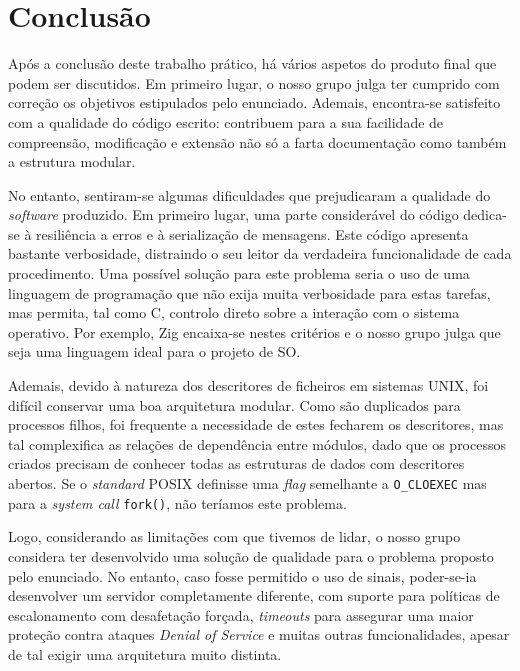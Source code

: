 \documentclass[11pt]{article}
\begin{document}
\section{Conclusão}

Após a conclusão deste trabalho prático, há vários aspetos do produto final que podem ser
discutidos. Em primeiro lugar, o nosso grupo julga ter cumprido com correção os objetivos
estipulados pelo enunciado. Ademais, encontra-se satisfeito com a qualidade do código escrito:
contribuem para a sua facilidade de compreensão, modificação e extensão não só a farta documentação
como também a estrutura modular.

No entanto, sentiram-se algumas dificuldades que prejudicaram a qualidade do \emph{software}
produzido. Em primeiro lugar, uma parte considerável do código dedica-se à resiliência a erros e à
serialização de mensagens. Este código apresenta bastante verbosidade, distraindo o seu leitor da
verdadeira funcionalidade de cada procedimento. Uma possível solução para este problema seria o uso
de uma linguagem de programação que não exija muita verbosidade para estas tarefas, mas permita, tal
como C, controlo direto sobre a interação com o sistema operativo. Por exemplo, Zig encaixa-se
nestes critérios e o nosso grupo julga que seja uma linguagem ideal para o projeto de SO.

Ademais, devido à natureza dos descritores de ficheiros em sistemas UNIX, foi difícil conservar uma
boa arquitetura modular. Como são duplicados para processos filhos, foi frequente a necessidade de
estes fecharem os descritores, mas tal complexifica as relações de dependência entre módulos, dado
que os processos criados precisam de conhecer todas as estruturas de dados com descritores abertos.
Se o \emph{standard} POSIX definisse uma \emph{flag} semelhante a \texttt{O\_CLOEXEC} mas para a
\emph{system call} \texttt{fork()}, não teríamos este problema.

Logo, considerando as limitações com que tivemos de lidar, o nosso grupo considera ter desenvolvido
uma solução de qualidade para o problema proposto pelo enunciado. No entanto, caso fosse permitido o
uso de sinais, poder-se-ia desenvolver um servidor completamente diferente, com suporte para
políticas de escalonamento com desafetação forçada, \emph{timeouts} para assegurar uma maior
proteção contra ataques \emph{Denial of Service} e muitas outras funcionalidades, apesar de tal
exigir uma arquitetura muito distinta.

\end{document}
